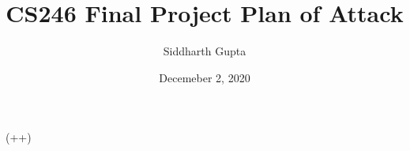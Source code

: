\documentclass[10pt]{article}
\title{CS246 Final Project Plan of Attack}
\author{Siddharth Gupta}
\date{Decemeber 2, 2020}
\begin{document}
	\maketitle
	(++)
\end{document}
